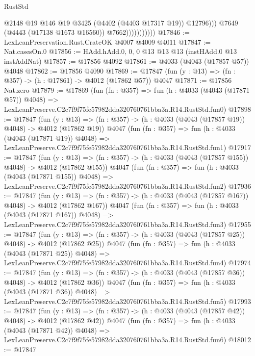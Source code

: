 \begin{lexlean}{RustStd}
\begin{coremodule}
                                @2148
                                @19
                                @146
                                @19
                                @3425
                                (@4402 (@4403 @17317 @19))
                                @12796)))
                          @7649
                          (@4443 (@17138 @1673 @16560))
                          @7662)))))))))))
@17846 := LexLeanPreservation.Rust.CrateOK @4007 @4009 @4011
@17847 := Nat.casesOn.{0}
@17856 := HAdd.hAdd.{0, 0, 0} @13 @13 @13 (instHAdd.{0} @13 instAddNat)
@17857 := @17856 @4092
@17861 := @4033 (@4043 (@17857 @57)) @4048
@17862 := @17856 @4090
@17869 := @17847 (fun (y : @13) => (fn : @357) -> (h : @17861) -> @4012 (@17862 @57)) @4047
@17871 := @17856 Nat.zero
@17879 := @17869
    (fun (fn : @357) =>
    fun (h : @4033 (@4043 (@17871 @57)) @4048) =>
    LexLeanPreserve.C2c7f9f75fe57982dda320760761bba3a.R14.RustStd.fun0)
@17898 := @17847
    (fun (y : @13) => (fn : @357) -> (h : @4033 (@4043 (@17857 @19)) @4048) -> @4012 (@17862 @19))
    @4047
    (fun (fn : @357) =>
    fun (h : @4033 (@4043 (@17871 @19)) @4048) =>
    LexLeanPreserve.C2c7f9f75fe57982dda320760761bba3a.R14.RustStd.fun1)
@17917 := @17847
    (fun (y : @13) => (fn : @357) -> (h : @4033 (@4043 (@17857 @155)) @4048) -> @4012 (@17862 @155))
    @4047
    (fun (fn : @357) =>
    fun (h : @4033 (@4043 (@17871 @155)) @4048) =>
    LexLeanPreserve.C2c7f9f75fe57982dda320760761bba3a.R14.RustStd.fun2)
@17936 := @17847
    (fun (y : @13) => (fn : @357) -> (h : @4033 (@4043 (@17857 @167)) @4048) -> @4012 (@17862 @167))
    @4047
    (fun (fn : @357) =>
    fun (h : @4033 (@4043 (@17871 @167)) @4048) =>
    LexLeanPreserve.C2c7f9f75fe57982dda320760761bba3a.R14.RustStd.fun3)
@17955 := @17847
    (fun (y : @13) => (fn : @357) -> (h : @4033 (@4043 (@17857 @25)) @4048) -> @4012 (@17862 @25))
    @4047
    (fun (fn : @357) =>
    fun (h : @4033 (@4043 (@17871 @25)) @4048) =>
    LexLeanPreserve.C2c7f9f75fe57982dda320760761bba3a.R14.RustStd.fun4)
@17974 := @17847
    (fun (y : @13) => (fn : @357) -> (h : @4033 (@4043 (@17857 @36)) @4048) -> @4012 (@17862 @36))
    @4047
    (fun (fn : @357) =>
    fun (h : @4033 (@4043 (@17871 @36)) @4048) =>
    LexLeanPreserve.C2c7f9f75fe57982dda320760761bba3a.R14.RustStd.fun5)
@17993 := @17847
    (fun (y : @13) => (fn : @357) -> (h : @4033 (@4043 (@17857 @42)) @4048) -> @4012 (@17862 @42))
    @4047
    (fun (fn : @357) =>
    fun (h : @4033 (@4043 (@17871 @42)) @4048) =>
    LexLeanPreserve.C2c7f9f75fe57982dda320760761bba3a.R14.RustStd.fun6)
@18012 := @17847

\end{coremodule}
\end{lexlean}
